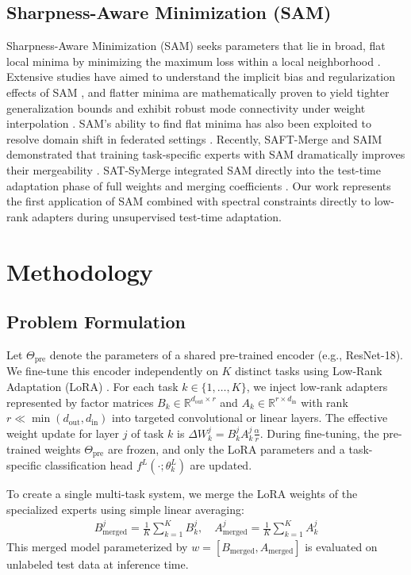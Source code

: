 \documentclass{article}
\theoremstyle{plain}
\theoremstyle{definition}
\theoremstyle{remark}
\begin{document}
\subsection{Sharpness-Aware Minimization (SAM)}
Sharpness-Aware Minimization (SAM) seeks parameters that lie in broad, flat local minima by minimizing the maximum loss within a local neighborhood \cite{foret2021sharpness}. Extensive studies have aimed to understand the implicit bias and regularization effects of SAM \cite{andriushchenko2022towards}, and flatter minima are mathematically proven to yield tighter generalization bounds and exhibit robust mode connectivity under weight interpolation \cite{kwon2021asam, du2021efficient}. SAM's ability to find flat minima has also been exploited to resolve domain shift in federated settings \cite{qu2022generalized}. Recently, SAFT-Merge and SAIM demonstrated that training task-specific experts with SAM dramatically improves their mergeability \cite{lee2025saft, marczak2025saim}. SAT-SyMerge integrated SAM directly into the test-time adaptation phase of full weights and merging coefficients \cite{jung2025symerge}. Our work represents the first application of SAM combined with spectral constraints directly to low-rank adapters during unsupervised test-time adaptation.

\section{Methodology}
\label{submission-methodology}
\subsection{Problem Formulation}
Let $\Theta_{\text{pre}}$ denote the parameters of a shared pre-trained encoder (e.g., ResNet-18). We fine-tune this encoder independently on $K$ distinct tasks using Low-Rank Adaptation (LoRA) \cite{hu2022lora}. For each task $k \in \{1, \dots, K\}$, we inject low-rank adapters represented by factor matrices $B_k \in \mathbb{R}^{d_{\text{out}} \times r}$ and $A_k \in \mathbb{R}^{r \times d_{\text{in}}}$ with rank $r \ll \min(d_{\text{out}}, d_{\text{in}})$ into targeted convolutional or linear layers. The effective weight update for layer $j$ of task $k$ is $\Delta W_k^j = B_k^j A_k^j \frac{\alpha}{r}$. During fine-tuning, the pre-trained weights $\Theta_{\text{pre}}$ are frozen, and only the LoRA parameters and a task-specific classification head $f^L(\cdot; \theta^L_k)$ are updated.

To create a single multi-task system, we merge the LoRA weights of the specialized experts using simple linear averaging:
\begin{align}
    B_{\text{merged}}^j = \frac{1}{K} \sum_{k=1}^K B_k^j, \quad A_{\text{merged}}^j = \frac{1}{K} \sum_{k=1}^K A_k^j
\end{align}
This merged model parameterized by $w = [B_{\text{merged}}, A_{\text{merged}}]$ is evaluated on unlabeled test data at inference time.
\end{document}
